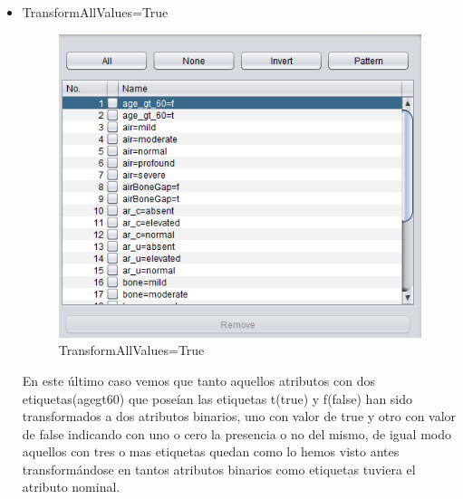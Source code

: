 \begin{itemize}
    \item TransformAllValues=True
    \begin{figure}[H]
    \centering
    \includegraphics[width=\textwidth]{img/TAV=True.PNG}
    \caption{TransformAllValues=True}
    
\end{figure}
En este último caso vemos que tanto aquellos atributos con dos etiquetas(agegt60) que poseían las etiquetas t(true) y f(false) han sido transformados a dos atributos binarios, uno con valor de true y otro con valor de false indicando con uno o cero la presencia o no del mismo, de igual modo aquellos con tres o mas etiquetas quedan como lo hemos visto antes transformándose en tantos atributos binarios como etiquetas tuviera el atributo nominal.
\end{itemize}

